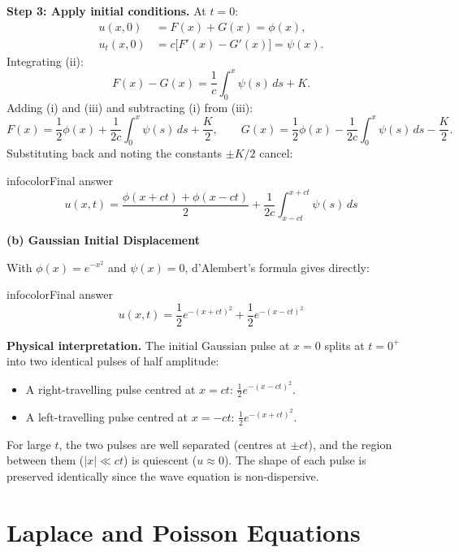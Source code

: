 \documentclass[a4paper,11pt]{article} %
\newenvironment{summarybox}[1][]{\begin{custombox}[#1]{infocolor}{Final answer}}{\end{custombox}}
\begin{document}
\textbf{Step 3: Apply initial conditions.}
At $t=0$:
\begin{align*}
    u(x,0) &= F(x) + G(x) = \phi(x), \tag{i}\\
    u_t(x,0) &= c\big[F'(x) - G'(x)\big] = \psi(x). \tag{ii}
\end{align*}
Integrating (ii):
\[
    F(x) - G(x) = \frac{1}{c}\int_0^x \psi(s)\,ds + K. \tag{iii}
\]
Adding (i) and (iii) and subtracting (i) from (iii):
\[
    F(x) = \frac{1}{2}\phi(x) + \frac{1}{2c}\int_0^x\psi(s)\,ds + \frac{K}{2}, \qquad
    G(x) = \frac{1}{2}\phi(x) - \frac{1}{2c}\int_0^x\psi(s)\,ds - \frac{K}{2}.
\]
Substituting back and noting the constants $\pm K/2$ cancel:

\begin{summarybox}[title={D'Alembert's Formula}]
$$u(x,t) = \frac{\phi(x+ct) + \phi(x-ct)}{2} + \frac{1}{2c}\int_{x-ct}^{x+ct}\psi(s)\,ds$$
\end{summarybox}

\textbf{(b) Gaussian Initial Displacement}

With $\phi(x) = e^{-x^2}$ and $\psi(x) = 0$, d'Alembert's formula gives directly:

\begin{summarybox}
$$u(x,t) = \frac{1}{2}e^{-(x+ct)^2} + \frac{1}{2}e^{-(x-ct)^2}$$
\end{summarybox}

\textbf{Physical interpretation.}
The initial Gaussian pulse at $x=0$ splits at $t=0^+$ into two identical pulses of half amplitude:
\begin{itemize}
    \item A right-travelling pulse centred at $x = ct$: $\frac{1}{2}e^{-(x-ct)^2}$.
    \item A left-travelling pulse centred at $x = -ct$: $\frac{1}{2}e^{-(x+ct)^2}$.
\end{itemize}
For large $t$, the two pulses are well separated (centres at $\pm ct$), and the region between them ($|x| \ll ct$) is quiescent ($u \approx 0$). The shape of each pulse is preserved identically since the wave equation is non-dispersive.

\newpage

\section{Laplace and Poisson Equations}
\end{document}
